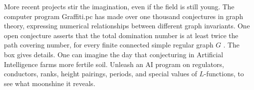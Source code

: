 \documentclass{llncs}
\begin{document}
%

More recent projects stir the imagination, even if the field
is still young.
The computer program  Graffiti.pc has made over one thousand
 conjectures in graph theory, expressing numerical relationships
between different graph invariants.
One open conjecture asserts that the total domination number is at least twice the
path covering number, for every finite connected simple regular graph $G$ \cite{DLPWW}.  The box gives details.
One can imagine the day that conjecturing in Artificial Intelligence farms more fertile soil.  Unleash an AI program on
 regulators, conductors, ranks, height pairings, periods, and special values of $L$-functions,
to see what  moonshine it reveals.
\end{document}
